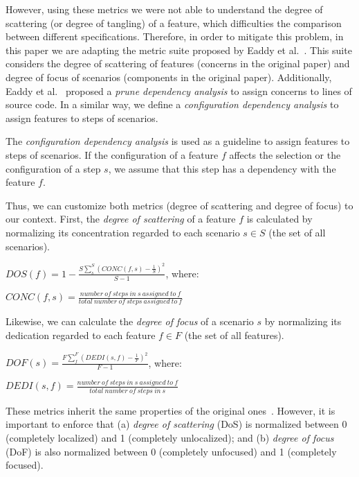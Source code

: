 However, using these metrics we were not able to understand the degree of
scattering (or degree of tangling) of a feature, which difficulties the comparison
between different specifications. Therefore, in order to mitigate this problem,
in this paper we are adapting the metric suite proposed by Eaddy et
al.~\cite{Eaddy:2007aa}. This suite considers the degree of scattering of
features (concerns in the original paper) and degree of focus of scenarios
(components in the original paper). Additionally, Eaddy et
al.~\cite{Eaddy:2007aa} proposed a \emph{prune dependency analysis} to assign
concerns to lines of source code. In a similar way, we define a
\emph{configuration dependency analysis} to assign features to steps of
scenarios.

\begin{definition}
The \emph{configuration dependency analysis} is used as a guideline to assign
features to steps of scenarios. If the configuration of a feature $f$
affects the selection or the configuration of a step $s$, we assume that this step has a
dependency with the feature $f$.
\end{definition}

Thus, we can customize both metrics (degree of scattering and degree of focus)
to our context. First, the \emph{degree of scattering} of a feature $f$ is
calculated by normalizing its concentration regarded to each scenario $s \in
S$ (the set of all scenarios).

\begin{center}
$DOS(f) = 1 - \frac{S \sum_{s}^{S}(CONC(f,s)-\frac{1}{S})^2}{S-1}$, where:

$CONC(f,s) = \frac{number\ of\ steps\ in\ s\ assigned\ to\ f}{total\ number\
of\ steps\ assigned\ to\ f}$
\end{center}

Likewise, we can calculate the \emph{degree of focus} of a scenario $s$ by
normalizing its dedication regarded to each feature $f \in F$ (the set of
all features).

\begin{center}
$DOF(s) = \frac{F \sum_{f}^{F}(DEDI(s,f)-\frac{1}{F})^2}{F-1}$, where:

$DEDI(s,f) = \frac{number\ of\ steps\ in\ s\ assigned\ to\ f}{total\ number\
of\ steps\ in\ s}$
\end{center}

These metrics inherit the same properties of the original
ones~\cite{Eaddy:2007aa}. However, it is important to enforce that (a)
\emph{degree of scattering} (DoS) is normalized between 0 (completely localized)
and 1 (completely unlocalized); and (b) \emph{degree of focus} (DoF) is also
normalized between 0 (completely unfocused) and 1 (completely focused).

